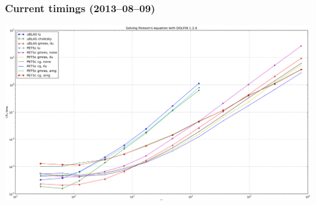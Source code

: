 \begin{frame}
  \frametitle{Current timings (2013--08--09)}

  \includegraphics[width=\textwidth]{png/linear_algebra_timings.png}

\end{frame}
